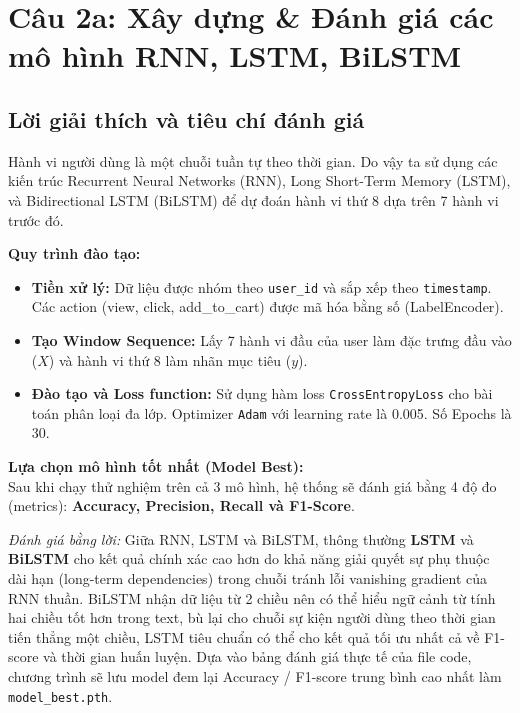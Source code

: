 \documentclass[12pt,a4paper]{article}
\begin{document}
\section{Câu 2a: Xây dựng \& Đánh giá các mô hình RNN, LSTM, BiLSTM}

\subsection{Lời giải thích và tiêu chí đánh giá}
Hành vi người dùng là một chuỗi tuần tự theo thời gian. Do vậy ta sử dụng các kiến trúc Recurrent Neural Networks (RNN), Long Short-Term Memory (LSTM), và Bidirectional LSTM (BiLSTM) để dự đoán hành vi thứ 8 dựa trên 7 hành vi trước đó.

\textbf{Quy trình đào tạo:}
\begin{itemize}
    \item \textbf{Tiền xử lý:} Dữ liệu được nhóm theo \texttt{user\_id} và sắp xếp theo \texttt{timestamp}. Các action (view, click, add\_to\_cart) được mã hóa bằng số (LabelEncoder).
    \item \textbf{Tạo Window Sequence:} Lấy 7 hành vi đầu của user làm đặc trưng đầu vào ($X$) và hành vi thứ 8 làm nhãn mục tiêu ($y$).
    \item \textbf{Đào tạo và Loss function:} Sử dụng hàm loss \texttt{CrossEntropyLoss} cho bài toán phân loại đa lớp. Optimizer \texttt{Adam} với learning rate là 0.005. Số Epochs là 30.
\end{itemize}

\textbf{Lựa chọn mô hình tốt nhất (Model Best):}\\
Sau khi chạy thử nghiệm trên cả 3 mô hình, hệ thống sẽ đánh giá bằng 4 độ đo (metrics): \textbf{Accuracy, Precision, Recall và F1-Score}.

\textit{Đánh giá bằng lời:} Giữa RNN, LSTM và BiLSTM, thông thường \textbf{LSTM} và \textbf{BiLSTM} cho kết quả chính xác cao hơn do khả năng giải quyết sự phụ thuộc dài hạn (long-term dependencies) trong chuỗi tránh lỗi vanishing gradient của RNN thuần. BiLSTM nhận dữ liệu từ 2 chiều nên có thể hiểu ngữ cảnh từ tính hai chiều tốt hơn trong text, bù lại cho chuỗi sự kiện người dùng theo thời gian tiến thẳng một chiều, LSTM tiêu chuẩn có thể cho kết quả tối ưu nhất cả về F1-score và thời gian huấn luyện. Dựa vào bảng đánh giá thực tế của file code, chương trình sẽ lưu model đem lại Accuracy / F1-score trung bình cao nhất làm \texttt{model\_best.pth}.
\end{document}
